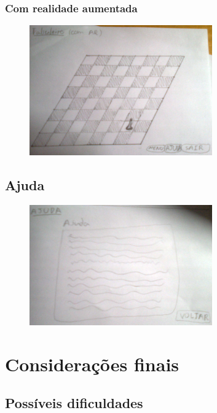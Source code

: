 \documentclass[a4paper,12pt]{article}
\begin{document}
\subsubsection{Com realidade aumentada}
\label{subsubsec: comrealidadeaumentada}

\begin{figure}[h]
\centering
\includegraphics[width=0.7\textwidth]{tabuleirocomar}
\end{figure}

\subsection{Ajuda}
\label{subsubsec: ajuda}

\begin{figure}[h]
\centering
\includegraphics[width=0.7\textwidth]{ajuda}
\end{figure}

\newpage
\section{Considera\c c\~oes finais}
\label{sec: consideracoesfinais}

\subsection{Poss\'iveis dificuldades}
\label{subsec: possiveisdificuldades}
\end{document}
